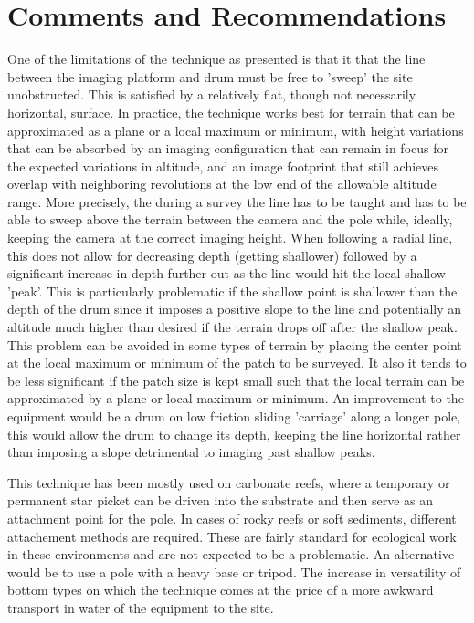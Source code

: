 \section{Comments and Recommendations}


One of the limitations of the technique as presented is that it that the line between the imaging platform and drum must be free to 'sweep' the site unobstructed. This is satisfied by a relatively flat, though not necessarily horizontal, surface. In practice, the technique works best for terrain that can be approximated as a plane or a local maximum or minimum, with height variations that can be absorbed by an imaging configuration that can remain in focus for the expected variations in altitude, and an image footprint that still achieves overlap with neighboring revolutions at the low end of the allowable altitude range.
More precisely, the during a survey the line has to be taught and has to be able to sweep above the terrain between the camera and the pole while, ideally, keeping the camera at the correct imaging height. When following a radial line, this does not allow for decreasing depth (getting shallower) followed by a significant increase in depth further out as the line would hit the local shallow 'peak'. This is particularly problematic if the shallow point is shallower than the depth of the drum since it imposes a positive slope to the line and potentially an altitude much higher than desired if the terrain drops off after the shallow peak. This problem can be avoided in some types of terrain by placing the center point at the local maximum or minimum of the patch to be surveyed. It also it tends to be less significant if the patch size is kept small such that the local terrain can be approximated by a plane or local maximum or minimum.
An improvement to the equipment would be a drum on low friction sliding 'carriage' along a longer pole, this would allow the drum to change its depth, keeping the line horizontal rather than imposing a slope detrimental to imaging past shallow peaks.

This technique has been mostly used on carbonate reefs, where a temporary or permanent star picket can be driven into the substrate and then serve as an attachment point for the pole. In cases of rocky reefs or soft sediments, different attachement methods are required. These are fairly standard for ecological work in these environments and are not expected to be a problematic. An alternative would be to use a pole with a heavy base or tripod. The increase in versatility of bottom types on which the technique comes at the price of a more awkward transport in water of the equipment to the site.